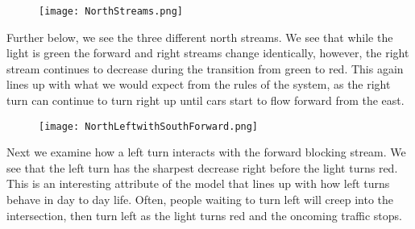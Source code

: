 \documentclass[12pt]{article}
\begin{document}
\begin{figure}[h!]
    \centering
    \texttt{[image: NorthStreams.png]}
    \label{fig:diagram}
\end{figure}

Further below, we see the three different north streams. We see that while the light is green the forward and right streams change identically, however, the right stream continues to decrease during the transition from green to red. This again lines up with what we would expect from the rules of the system, as the right turn can continue to turn right up until cars start to flow forward from the east.\\

\begin{figure}[h!]
    \centering
    \texttt{[image: NorthLeftwithSouthForward.png]}
    \label{fig:diagram}
\end{figure}

Next we examine how a left turn interacts with the forward blocking stream. We see that the left turn has the sharpest decrease right before the light turns red. This is an interesting attribute of the model that lines up with how left turns behave in day to day life. Often, people waiting to turn left will creep into the intersection, then turn left as the light turns red and the oncoming traffic stops.\\



\end{document}

